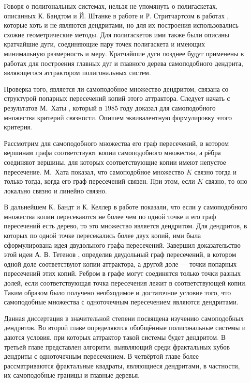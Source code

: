 Говоря о полигональных системах, нельзя не упомянуть о полигаскетах, описанных К. Бандтом и Й. Штанке в работе \cite{SSS6} и Р. Стритчартсом в работах \cite{strich1999, Strichartz1999}, которые хоть и не являются дендритами, но для их построения использовались схожие геометрические методы.
Для полигаскетов ими также были описаны кратчайшие дуги, соединяющие пару точек полигаскета и имеющих минимальную размерность и меру.
Кратчайшие дуги позднее будут применены в работах \cite{TSV2017, STV2017} для построения главных дуг и главного дерева самоподобного дендрита, являющегося аттрактором полигональных систем.

Проверка того, является ли самоподобное множество дендритом, связана со структурой попарных пересечений копий этого аттрактора.
Следует начать с результатов М.~Хаты \cite{Hata1985}, который в 1985 году доказал для самоподобного множества критерий связности.
Опишем эквивалентную формулировку этого критерия.

Рассмотрим для самоподобного множества его граф пересечений, в котором вершинам графа соответствуют копии самоподобного множества, а рёбра соединяют вершины, для которых соответствующие копии имеют непустое пересечение.
М.~Хата показал, что самоподобное множество $K$ связно тогда и только тогда, когда его граф пересечений связен.
При этом, если $K$ связно, то оно локально связно и линейно связно.

В дальнейшем К. Бандт и К. Келлер в работе \cite{SSS2} показали, что если у самоподобного множества копии пересекаются не более чем по одной точке и его граф пересечений есть дерево, то это множество является дендритом. Для дендритов, в которых по одной точке пересекались более двух копий, ими была сформулирована идея двудольного графа пересечений.
Завершил доказательство этой идеи А. В. Тетенов \cite{FIP}, определив двудольный граф пересечений, в котором одной доле соответствуют копии аттрактора, а другой доле --- точки попарных пересечений этих копий. Ребром в графе могут соединятся только точки разных долей, если соответствующая точка пересечения лежит в соответствующей копии.
Таким образом было получено необходимое и достаточное условие того, что самоподобные множества с одноточечным пересечением являются дендритами.

Данная диссертация в значительной степени посвящена изучению самоподобных дендритов.
Во второй главе определяются обобщённые полигональные системы и даются условия, при которых аттрактор такой системы будет дендритом.
В третьей главе представлен алгоритм, выявляющий среди фрактальных кубов дендриты с одноточечным пересечением.
В четвёртой главе более рассматриваются фрактальные квадраты, являющиеся дендритами, в частности, их самоподобные границы и главные деревья.


